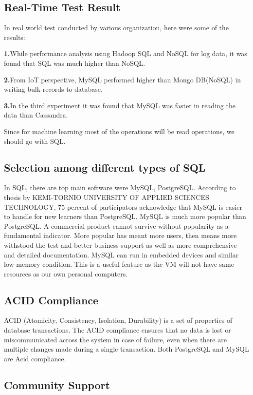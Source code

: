 \documentclass{article}
\begin{document}
\subsection{Real-Time Test Result}

In real world test conducted by various organization, here were some of the results:
\item \textbf{1.}While performance analysis using Hadoop SQL and NoSQL for log data, it was found that SQL was much higher than NoSQL.
\item \textbf{2.}From IoT perspective, MySQL performed higher than Mongo DB(NoSQL) in writing bulk records to database.
\item \textbf{3.}In the third experiment it was found that MySQL was faster in reading the data than Cassandra.

Since for machine learning most of the operations will be read operations, we should go with SQL. 


\subsection{Selection among different types of SQL}

In SQL, there are top main software were MySQL, PostgreSQL. According to thesis by KEMI-TORNIO UNIVERSITY OF APPLIED SCIENCES TECHNOLOGY, 75 percent of participators acknowledge that MySQL is easier to handle for new learners than PostgreSQL. MySQL is much more popular than PostgreSQL. A commercial product cannot survive without popularity as a fundamental indicator. More popular has meant more users, then means more withstood the test and better business support as well as more comprehensive and detailed documentation. MySQL can run in embedded devices and similar low memory condition. This is a useful feature as the VM will not have same resources as our own personal computers.

\subsection{ACID Compliance}

ACID (Atomicity, Consistency, Isolation, Durability) is a set of properties of database transactions. The ACID compliance ensures that no data is lost or miscommunicated across the system in case of failure, even when there are multiple changes made during a single transaction. Both PostgreSQL and MySQL are Acid compliance.


\subsection{Community Support}
\end{document}
